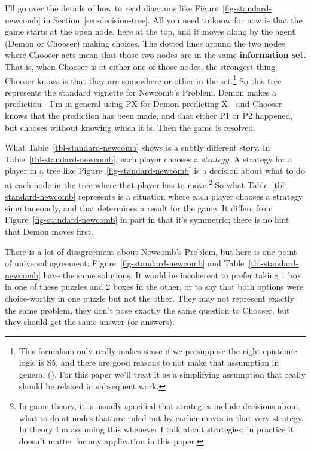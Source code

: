 \documentclass[
  10pt,
  letterpaper,
  DIV=11,
  numbers=noendperiod,
  twoside]{scrartcl}
\begin{document}
I'll go over the details of how to read diagrams like
Figure~\ref{fig-standard-newcomb} in Section~\ref{sec-decision-tree}.
All you need to know for now is that the game starts at the open node,
here at the top, and it moves along by the agent (Demon or Chooser)
making choices. The dotted lines around the two nodes where Chooser acts
mean that those two nodes are in the same \textbf{information set}. That
is, when Chooser is at either one of those nodes, the strongest thing
Chooser knows is that they are somewhere or other in the set.\footnote{This
  formalism only really makes sense if we presuppose the right epistemic
  logic is S5, and there are good reasons to not make that assumption in
  general ().
  For this paper we'll treat it as a simplifying assumption that really
  should be relaxed in subsequent work.} So this tree represents the
standard vignette for Newcomb's Problem. Demon makes a prediction - I'm
in general using PX for Demon predicting X - and Chooser knows that the
prediction has been made, and that either P1 or P2 happened, but chooses
without knowing which it is. Then the game is resolved.

What Table~\ref{tbl-standard-newcomb} shows is a subtly different story.
In Table~\ref{tbl-standard-newcomb}, each player chooses a
\emph{strategy}. A strategy for a player in a tree like
Figure~\ref{fig-standard-newcomb} is a decision about what to do at each
node in the tree where that player has to move.\footnote{In game theory,
  it is usually specified that strategies include decisions about what
  to do at nodes that are ruled out by earlier moves in that very
  strategy. In theory I'm assuming this whenever I talk about
  strategies; in practice it doesn't matter for any application in this
  paper.} So what Table~\ref{tbl-standard-newcomb} represents is a
situation where each player chooses a strategy simultaneously, and that
determines a result for the game. It differs from
Figure~\ref{fig-standard-newcomb} in part in that it's symmetric; there
is no hint that Demon moves first.

There is a lot of disagreement about Newcomb's Problem, but here is one
point of universal agreement: Figure~\ref{fig-standard-newcomb} and
Table~\ref{tbl-standard-newcomb} have the same solutions. It would be
incoherent to prefer taking 1 box in one of these puzzles and 2 boxes in
the other, or to say that both options were choice-worthy in one puzzle
but not the other. They may not represent exactly the same problem, they
don't pose exactly the same question to Chooser, but they should get the
same answer (or answers).
\end{document}
